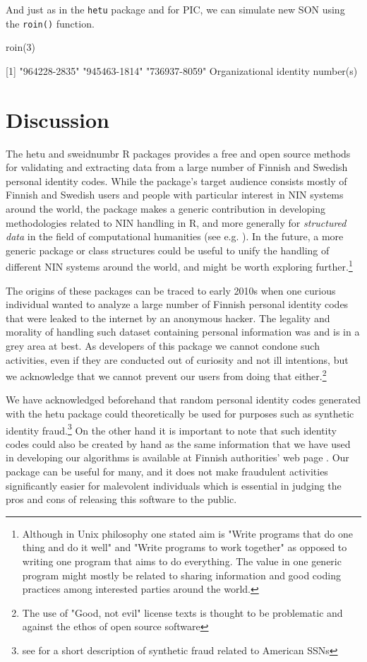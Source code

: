 And just as in the \texttt{hetu} package and for PIC, we can simulate new SON using the \texttt{roin()} function.

 \begin{example}
   roin(3)

   [1] "964228-2835" "945463-1814" "736937-8059"
   Organizational identity number(s)
 \end{example}


\section{Discussion}

The hetu and sweidnumbr R packages provides a free and open source methods for validating and extracting data from a large number of Finnish and Swedish personal identity codes. While the package's target audience consists mostly of Finnish and Swedish users and people with particular interest in NIN systems around the world, the package makes a generic contribution in developing methodologies related to NIN handling in R, and more generally for {\it structured data} in the field of computational humanities (see e.g. \citep{makela2020}). In the future, a more generic package or class structures could be useful to unify the handling of different NIN systems around the world, and might be worth exploring further.\footnote{Although in Unix philosophy one stated aim is "Write programs that do one thing and do it well" and "Write programs to work together" as opposed to writing one program that aims to do everything. The value in one generic program might mostly be related to sharing information and good coding practices among interested parties around the world.}

The origins of these packages can be traced to early 2010s when one curious individual wanted to analyze a large number of Finnish personal identity codes that were leaked to the internet by an anonymous hacker. The legality and morality of handling such dataset containing personal information was and is in a grey area at best. As developers of this package we cannot condone such activities, even if they are conducted out of curiosity and not ill intentions, but we acknowledge that we cannot prevent our users from doing that either.\footnote{The use of "Good, not evil" license texts is thought to be problematic and against the ethos of open source software} 

We have acknowledged beforehand that random personal identity codes generated with the hetu package could theoretically be used for purposes such as synthetic identity fraud.\footnote{see \citet[32]{brensinger2021} for a short description of synthetic fraud related to American SSNs} On the other hand it is important to note that such identity codes could also be created by hand as the same information that we have used in developing our algorithms is available at Finnish authorities' web page \citep{hetudvv}. Our package can be useful for many, and it does not make fraudulent activities significantly easier for malevolent individuals which is essential in judging the pros and cons of releasing this software to the public.

